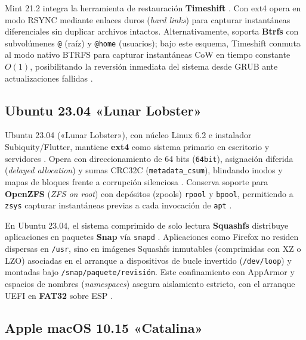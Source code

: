 \documentclass[12pt]{article}
\begin{document}
Mint 21.2 integra la herramienta de restauración \textbf{Timeshift} \parencite{linuxmint2023victoria}. Con ext4 opera en modo RSYNC mediante enlaces duros (\textit{hard links}) para capturar instantáneas diferenciales sin duplicar archivos intactos. Alternativamente, soporta \textbf{Btrfs} con subvolúmenes \texttt{@} (raíz) y \texttt{@home} (usuarios); bajo este esquema, Timeshift conmuta al modo nativo BTRFS para capturar instantáneas CoW en tiempo constante $O(1)$, posibilitando la reversión inmediata del sistema desde GRUB ante actualizaciones fallidas \parencite{linuxmint2023victoria}.

\subsection{Ubuntu 23.04 «Lunar Lobster»}
\label{subsec:ubuntuLunarLobster}

Ubuntu 23.04 («Lunar Lobster»), con núcleo Linux 6.2 e instalador Subiquity/Flutter, mantiene \textbf{ext4} como sistema primario en escritorio y servidores \parencite{canonical2023ubuntu}. Opera con direccionamiento de 64 bits (\texttt{64bit}), asignación diferida (\textit{delayed allocation}) y sumas CRC32C (\texttt{metadata\_csum}), blindando inodos y mapas de bloques frente a corrupción silenciosa \parencite{kernel2024ext4}. Conserva soporte para \textbf{OpenZFS} (\textit{ZFS on root}) con depósitos (zpools) \texttt{rpool} y \texttt{bpool}, permitiendo a \texttt{zsys} capturar instantáneas previas a cada invocación de \texttt{apt} \parencite{canonical2023ubuntu, openzfs2024docs}.

En Ubuntu 23.04, el sistema comprimido de solo lectura \textbf{Squashfs} distribuye aplicaciones en paquetes \textbf{Snap} vía \texttt{snapd} \parencite{canonical2023ubuntu, kernel2024squashfs}. Aplicaciones como Firefox no residen dispersas en \texttt{/usr}, sino en imágenes Squashfs inmutables (comprimidas con XZ o LZO) asociadas en el arranque a dispositivos de bucle invertido (\texttt{/dev/loop}) y montadas bajo \texttt{/snap/}\allowbreak\texttt{paquete/}\allowbreak\texttt{revisión}. Este confinamiento con AppArmor y espacios de nombres (\textit{namespaces}) asegura aislamiento estricto, con el arranque UEFI en \textbf{FAT32} sobre ESP \parencite{canonical2023ubuntu}.

\subsection{Apple macOS 10.15 «Catalina»}
\label{subsec:macosCatalina}
\end{document}
